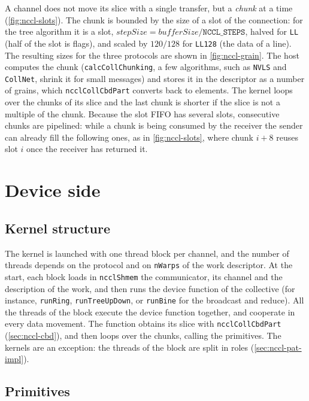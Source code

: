 A channel does not move its slice with a single transfer, but a \emph{chunk} at a time (\cref{fig:nccl-slots}).
The chunk is bounded by the size of a slot of the connection: for the tree algorithm it is a slot, $\mathit{stepSize}=\mathit{bufferSize}/\texttt{NCCL\_STEPS}$, halved for \texttt{LL} (half of the slot is flags), and scaled by $120/128$ for \texttt{LL128} (the data of a line). The resulting sizes for the three protocols are shown in \cref{fig:nccl-grain}.
The host computes the chunk (\texttt{calcCollChunking}, a few algorithms, such as \texttt{NVLS} and \texttt{CollNet}, shrink it for small messages) and stores it in the descriptor as a number of grains, which \texttt{ncclCollCbdPart} converts back to elements.
The kernel loops over the chunks of its slice and the last chunk is shorter if the slice is not a multiple of the chunk.
Because the slot FIFO has several slots, consecutive chunks are pipelined: while a chunk is being consumed by the receiver the sender can already fill the following ones, as in \cref{fig:nccl-slots}, where chunk $i+8$ reuses slot $i$ once the receiver has returned it.

\section{Device side}\label{sec:nccl-device}

\subsection{Kernel structure}

The kernel is launched with one thread block per channel, and the number of threads depends on the protocol and on \texttt{nWarps} of the work descriptor.
At the start, each block loads in \texttt{ncclShmem} the communicator, its channel and the description of the work, and then runs the device function of the collective (for instance, \texttt{runRing}, \texttt{runTreeUpDown}, or \texttt{runBine} for the \bine{} broadcast and reduce).
All the threads of the block execute the device function together, and cooperate in every data movement.
The function obtains its slice with \texttt{ncclCollCbdPart} (\cref{sec:nccl-cbd}), and then loops over the chunks, calling the primitives.
The \pat{} kernels are an exception: the threads of the block are split in roles (\cref{sec:nccl-pat-impl}).

\subsection{Primitives}\label{sec:nccl-primitives}

